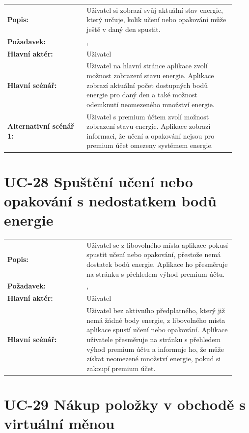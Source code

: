 \begin{tabular}{p{0.32\linewidth}p{0.6\linewidth}}
  \textbf{Popis:} & Uživatel si zobrazí svůj aktuální stav energie, který určuje, kolik učení nebo opakování může ještě v daný den spustit. \\
  \textbf{Požadavek:} & \nameref{sec:fp-energy-status}, \nameref{sec:fp-subscription-system} \\
  \textbf{Hlavní aktér:} & Uživatel \\
  \textbf{Hlavní scénář:} & Uživatel na hlavní stránce aplikace zvolí možnost zobrazení stavu energie. Aplikace zobrazí aktuální počet dostupných bodů energie pro daný den a také možnost odemknutí neomezeného množství energie. \\
  \textbf{Alternativní scénář 1:} & Uživatel s premium účtem zvolí možnost zobrazení stavu energie. Aplikace zobrazí informaci, že učení a opakování nejsou pro premium účet omezeny systémem energie. \\
\end{tabular}

\section{UC-28 Spuštění učení nebo opakování s nedostatkem bodů energie}\label{sec:uc-28}

\begin{tabular}{p{0.32\linewidth}p{0.6\linewidth}}
  \textbf{Popis:} & Uživatel se z libovolného místa aplikace pokusí spustit učení nebo opakování, přestože nemá dostatek bodů energie. Aplikace ho přesměruje na stránku s přehledem výhod premium účtu. \\
  \textbf{Požadavek:} & \nameref{sec:fp-energy-status}, \nameref{sec:fp-subscription-system} \\
  \textbf{Hlavní aktér:} & Uživatel \\
  \textbf{Hlavní scénář:} & Uživatel bez aktivního předplatného, který již nemá žádné body energie, z libovolného místa aplikace spustí učení nebo opakování. Aplikace uživatele přesměruje na stránku s přehledem výhod premium účtu a informuje ho, že může získat neomezené množství energie, pokud si zakoupí premium účet. \\
\end{tabular}

\section{UC-29 Nákup položky v obchodě s virtuální měnou}\label{sec:uc-29}

